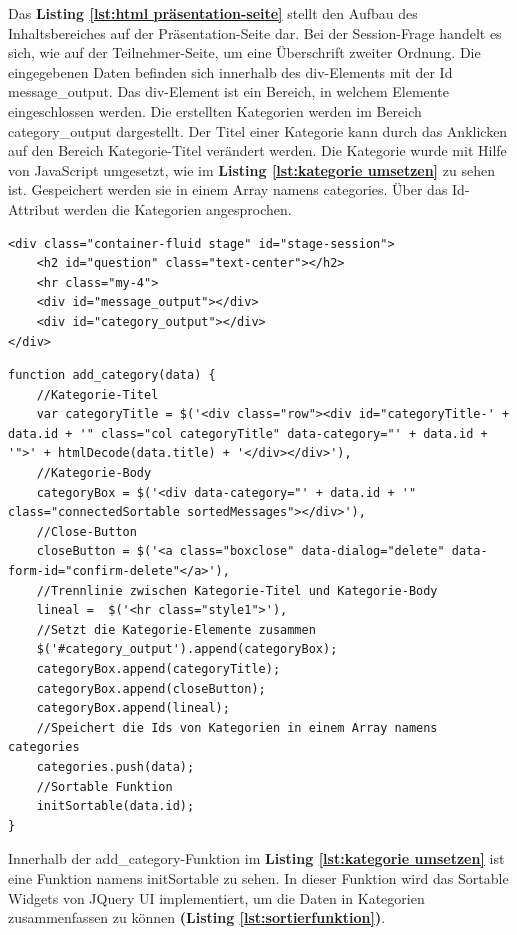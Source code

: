 \newpage
Das \textbf{Listing \ref{lst:html präsentation-seite}} stellt den Aufbau des Inhaltsbereiches auf der Präsentation-Seite dar. Bei der Session-Frage handelt es sich, wie auf der Teilnehmer-Seite, um eine Überschrift zweiter Ordnung. Die eingegebenen Daten befinden sich innerhalb des div-Elements mit der Id \glqq message\_output\grqq{}. Das div-Element ist ein Bereich, in welchem Elemente eingeschlossen werden. Die erstellten Kategorien werden im Bereich \glqq category\_output\grqq{} dargestellt. Der Titel einer Kategorie kann durch das Anklicken auf den Bereich \glqq Kategorie-Titel\grqq{} verändert werden. Die Kategorie wurde mit Hilfe von JavaScript umgesetzt, wie im \textbf{Listing \ref{lst:kategorie umsetzen}} zu sehen ist. Gespeichert werden sie in einem Array namens \glqq categories\grqq{}. Über das Id-Attribut werden die Kategorien angesprochen.\bigskip

\begin{lstlisting}[caption={HTML-Struktur der Präsentation-Seite}, label=lst:html präsentation-seite, captionpos=b]
<div class="container-fluid stage" id="stage-session">
	<h2 id="question" class="text-center"></h2>
    <hr class="my-4">
    <div id="message_output"></div>
    <div id="category_output"></div>
</div>

\end{lstlisting}
\bigskip

\begin{lstlisting}[caption={Kategorie umsetzen - JavaScript}, label=lst:kategorie umsetzen, captionpos=b]
function add_category(data) {
	//Kategorie-Titel
	var categoryTitle = $('<div class="row"><div id="categoryTitle-' + data.id + '" class="col categoryTitle" data-category="' + data.id + '">' + htmlDecode(data.title) + '</div></div>'),
	//Kategorie-Body
	categoryBox = $('<div data-category="' + data.id + '" class="connectedSortable sortedMessages"></div>'),
	//Close-Button
	closeButton = $('<a class="boxclose" data-dialog="delete" data-form-id="confirm-delete"</a>'),
	//Trennlinie zwischen Kategorie-Titel und Kategorie-Body
	lineal =  $('<hr class="style1">'),
	//Setzt die Kategorie-Elemente zusammen
	$('#category_output').append(categoryBox);
	categoryBox.append(categoryTitle);
	categoryBox.append(closeButton);
	categoryBox.append(lineal);
	//Speichert die Ids von Kategorien in einem Array namens categories
	categories.push(data);
	//Sortable Funktion
	initSortable(data.id);
}
\end{lstlisting}
\bigskip

\newpage
Innerhalb der \glqq add\_category\grqq{}-Funktion im \textbf{Listing \ref{lst:kategorie umsetzen}} ist eine Funktion namens \glqq initSortable\grqq{} zu sehen. In dieser Funktion wird das Sortable Widgets von JQuery UI implementiert, um die Daten in Kategorien zusammenfassen zu können \textbf{(Listing \ref{lst:sortierfunktion})}.\bigskip

